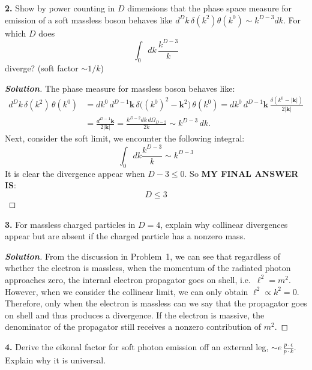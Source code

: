 \documentclass[11pt]{article}
\newenvironment{solution}[1][]{\begin{proof}[\textbf{Solution}]}{\end{proof}}
\begin{document}
\begin{tcolorbox}[problem]
\textbf{2.} Show by power counting in $D$ dimensions that the phase space measure for emission of a soft massless boson behaves like $d^Dk\,\delta(k^2)\theta(k^0)\sim k^{D-3}dk$. For which $D$ does $$\int_0 dk\,\frac{k^{D-3}}{k}$$ diverge? (soft factor $\sim 1/k$)
\end{tcolorbox}
\begin{solution}[15.2]
	The phase measure for massless boson behaves like:
	\[
	\begin{aligned}
	d^Dk\,\delta(k^2)\,\theta(k^0)
	&= dk^0\,d^{D-1}\mathbf{k}\,\delta\!\big((k^0)^2-\mathbf{k}^2\big)\,\theta(k^0)
	= dk^0\,d^{D-1}\mathbf{k}\,\frac{\delta(k^0-|\mathbf{k}|)}{2|\mathbf{k}|}\\
	&= \frac{d^{D-1}\mathbf{k}}{2|\mathbf{k}|}
	= \frac{k^{D-2}dk\,d\Omega_{D-2}}{2k}
	\sim k^{D-3}\,dk .
	\end{aligned}
	\]
	Next, consider the soft limit, we encounter the following integral:
	\[
	\int_0dk\frac{k^{D-3}}{k}\sim k^{D-3}
	\]
	It is clear the divergence appear when $D-3\leq 0$. So \textbf{MY FINAL ANSWER IS}:
	\[
	\boxed{
	D\leq 3
	}
	\]
\end{solution}
\begin{tcolorbox}[problem]
\textbf{3.} For massless charged particles in $D=4$, explain why collinear divergences appear but are absent if the charged particle has a nonzero mass.
\end{tcolorbox}
\begin{solution}[15.3]
	From the discussion in Problem~1, we can see that regardless of whether the electron is massless, when the momentum of the radiated photon approaches zero, the internal electron propagator goes on shell, i.e.\ \(\ell^2 = m^2\). However, when we consider the collinear limit, we can only obtain \(\ell^2 \propto k^2 = 0\). Therefore, only when the electron is massless can we say that the propagator goes on shell and thus produces a divergence. If the electron is massive, the denominator of the propagator still receives a nonzero contribution of \(m^2\).
\end{solution}
\begin{tcolorbox}[problem]
\textbf{4.} Derive the eikonal factor for soft photon emission off an external leg, $\sim e\,\frac{p\cdot\epsilon}{p\cdot k}$. Explain why it is universal.
\end{tcolorbox}
\end{document}
